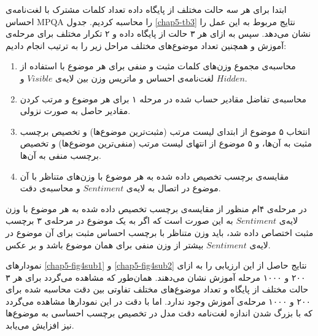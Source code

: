 ابتدا برای هر سه‌ حالت مختلف از پایگاه داده تعداد کلمات مشترک با لغت‌نامه‌ی احساس
MPQA
را محاسبه کردیم. جدول
\ref{chap5-tb3}
نتایج مربوط به این عمل را نشان می‌‌دهد. سپس به ازای هر ۳ حالت از پایگاه داده و ۲ تکرار مختلف برای مرحله‌ی آموزش و همچنین تعداد موضوع‌های مختلف مراحل زیر را به ترتیب انجام دادیم:
\begin{enumerate}
	\item محاسبه‌ی مجموع وزن‌های کلمات مثبت و منفی‌ برای هر موضوع با استفاده از لغت‌نامه‌ی احساس و ماتریس وزن بین لایه‌ی $Visible$ و $Hidden$. 
	\item محاسبه‌ی تفاضل مقادیر حساب شده در مرحله ۱ برای هر موضوع و مرتب کردن مقادیر حاصل به صورت نزولی.
	\item انتخاب ۵ موضوع از ابتدای لیست مرتب (مثبت‌ترین موضوع‌ها) و تخصیص برچسب مثبت به آن‌ها، و ۵ موضوع از انتهای لیست مرتب (منفی‌ترین موضوع‌ها) و تخصیص برچسب منفی‌ به آن‌ها.
	\item مقایسه‌ی برچسب تخصیص داده شده به هر موضوع با وزن‌های متناظر با آن موضوع در اتصال به لایه‌ی
	$Sentiment$
	و محاسبه‌ی دقت.
\end{enumerate}

در مرحله‌ی ۴ام منظور از مقایسه‌ی برچسب تخصیص داده شده به هر موضوع با وزن لایه‌ی
$Sentiment$
به این صورت است که اگر به یک موضوع در مرحله‌ی ۳ برچسب مثبت اختصاص داده شد، باید وزن متناظر با برچسب احساس مثبت برای آن موضوع در لایه‌ی
$Sentiment$
بیشتر از وزن منفی‌ برای همان موضوع باشد و بر عکس.

نمودار‌های
\ref{chap5-fig4sub1}
و
\ref{chap5-fig4sub2}
نتایج حاصل از این ارزیابی را به ازای ۲۰۰ و ۱۰۰۰ مرحله آموزش نشان می‌‌دهند. همان‌طور که مشاهده می‌‌گردد برای هر ۳ حالت مختلف از پایگاه و تعداد موضوع‌های مختلف تفاوتی‌ بین دقت محاسبه شده برای ۲۰۰ و ۱۰۰۰ مرحله‌‌ی آموزش وجود ندارد. اما با دقت در این نمودارها مشاهده می‌‌گردد که با بزرگ شدن اندازه لغت‌نامه دقت مدل در تخصیص برچسب احساسی‌ به موضوع‌ها نیز افزایش می‌‌یابد.


